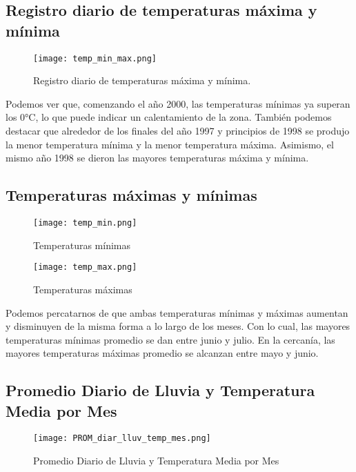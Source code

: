 \documentclass[12pt]{article}
\begin{document}
\subsection{Registro diario de temperaturas máxima y mínima}

\begin{figure}[H]
    \centering
    \texttt{[image: temp\_min\_max.png]}
    \caption{Registro diario de temperaturas máxima y mínima.}
\end{figure}

Podemos ver que, comenzando el año 2000, las temperaturas mínimas ya superan los 0°C, lo que puede indicar un calentamiento de la zona. También podemos destacar que alrededor de los finales del año 1997 y principios de 1998 se produjo la menor temperatura mínima y la menor temperatura máxima. Asimismo, el mismo año 1998 se dieron las mayores temperaturas máxima y mínima.
\clearpage

\subsection{Temperaturas máximas y mínimas}

\begin{figure}[H]
    \centering
    \texttt{[image: temp\_min.png]}
    \caption{Temperaturas mínimas}
\end{figure}

\begin{figure}[H]
    \centering
    \texttt{[image: temp\_max.png]}
    \caption{Temperaturas máximas}
\end{figure}

Podemos percatarnos de que ambas temperaturas mínimas y máximas aumentan y disminuyen de la misma forma a lo largo de los meses. Con lo cual, las mayores temperaturas mínimas promedio se dan entre junio y julio. En la cercanía, las mayores temperaturas máximas promedio se alcanzan entre mayo y junio.
\clearpage

\subsection{Promedio Diario de Lluvia y Temperatura Media por Mes}

\begin{figure}[H]
    \centering
    \texttt{[image: PROM\_diar\_lluv\_temp\_mes.png]}
    \caption{Promedio Diario de Lluvia y Temperatura Media por Mes}
\end{figure}
\end{document}
